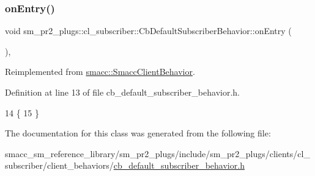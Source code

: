 \subsubsection{\texorpdfstring{on\+Entry()}{onEntry()}}
{\footnotesize\ttfamily void sm\+\_\+pr2\+\_\+plugs\+::cl\+\_\+subscriber\+::\+Cb\+Default\+Subscriber\+Behavior\+::on\+Entry (\begin{DoxyParamCaption}{ }\end{DoxyParamCaption})\hspace{0.3cm}{\ttfamily [inline]}, {\ttfamily [virtual]}}



Reimplemented from \hyperlink{classsmacc_1_1SmaccClientBehavior_a7962382f93987c720ad432fef55b123f}{smacc\+::\+Smacc\+Client\+Behavior}.



Definition at line 13 of file cb\+\_\+default\+\_\+subscriber\+\_\+behavior.\+h.


\begin{DoxyCode}
14     \{
15     \}
\end{DoxyCode}


The documentation for this class was generated from the following file\+:\begin{DoxyCompactItemize}
\item 
smacc\+\_\+sm\+\_\+reference\+\_\+library/sm\+\_\+pr2\+\_\+plugs/include/sm\+\_\+pr2\+\_\+plugs/clients/cl\+\_\+subscriber/client\+\_\+behaviors/\hyperlink{sm__pr2__plugs_2include_2sm__pr2__plugs_2clients_2cl__subscriber_2client__behaviors_2cb__default__subscriber__behavior_8h}{cb\+\_\+default\+\_\+subscriber\+\_\+behavior.\+h}\end{DoxyCompactItemize}
